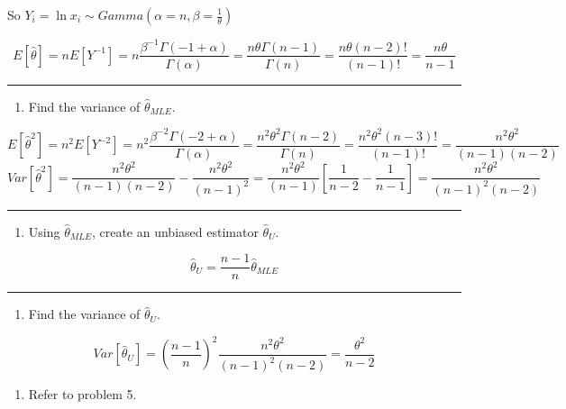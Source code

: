 \documentclass[12pt,]{article}
\providecommand{\tightlist}{%
  \setlength{\itemsep}{0pt}\setlength{\parskip}{0pt}}
\begin{document}
So \(Y_i=\ln x_i\sim Gamma(\alpha=n,\beta=\frac1{\theta})\)

\[E[\hat\theta]=nE[Y^{-1}]=n\frac{\beta^{-1}\Gamma(-1+\alpha)}{\Gamma(\alpha)}=\frac{n\theta\Gamma(n-1)}{\Gamma(n)}=\frac{n\theta(n-2)!}{(n-1)!}=\frac{n\theta}{n-1}\]

\begin{center}\rule{0.5\linewidth}{\linethickness}\end{center}

\begin{enumerate}
\def\labelenumi{\alph{enumi}.}
\setcounter{enumi}{2}
\tightlist
\item
  \textcolor[rgb]{0.5,0.5,0.5}{Find the variance of $\hat\theta_{MLE}$.}
\end{enumerate}

\[E[\hat\theta^2]=n^2E[Y^{-2}]=n^2\frac{\beta^{-2}\Gamma(-2+\alpha)}{\Gamma(\alpha)}=\frac{n^2\theta^2\Gamma(n-2)}{\Gamma(n)}=\frac{n^2\theta^2(n-3)!}{(n-1)!}=\frac{n^2\theta^2}{(n-1)(n-2)}\]
\[Var[\hat\theta^2]=\frac{n^2\theta^2}{(n-1)(n-2)}-\frac{n^2\theta^2}{(n-1)^2}=\frac{n^2\theta^2}{(n-1)}[\frac1{n-2}-\frac1{n-1}]=\frac{n^2\theta^2}{(n-1)^2(n-2)}\]

\begin{center}\rule{0.5\linewidth}{\linethickness}\end{center}

\begin{enumerate}
\def\labelenumi{\alph{enumi}.}
\setcounter{enumi}{3}
\tightlist
\item
  \textcolor[rgb]{0.5,0.5,0.5}{Using $\hat\theta_{MLE}$, create an unbiased estimator $\hat\theta_{U}$.}
\end{enumerate}

\[\hat\theta_{U}=\frac{n-1}{n}\hat\theta_{MLE}\]

\begin{center}\rule{0.5\linewidth}{\linethickness}\end{center}

\begin{enumerate}
\def\labelenumi{\alph{enumi}.}
\setcounter{enumi}{4}
\tightlist
\item
  \textcolor[rgb]{0.5,0.5,0.5}{Find the variance of $\hat\theta_{U}$.}
\end{enumerate}

\[Var[\hat\theta_{U}]=(\frac{n-1}{n})^2\frac{n^2\theta^2}{(n-1)^2(n-2)}=\frac{\theta^2}{n-2}\]

\begin{enumerate}
\def\labelenumi{\arabic{enumi}.}
\setcounter{enumi}{5}
\tightlist
\item
  \textcolor[rgb]{0.5,0.5,0.5}{Refer to problem 5.}
\end{enumerate}
\end{document}
